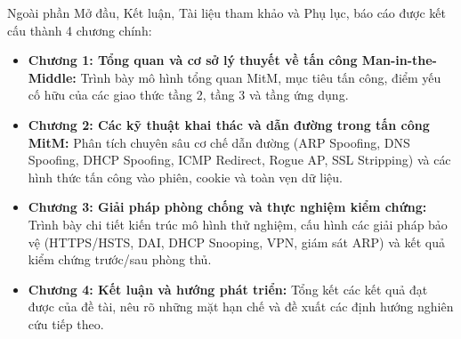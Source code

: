 Ngoài phần Mở đầu, Kết luận, Tài liệu tham khảo và Phụ lục, báo cáo được kết cấu thành 4 chương chính:
\begin{itemize}
  \item \textbf{Chương 1: Tổng quan và cơ sở lý thuyết về tấn công Man-in-the-Middle:} Trình bày mô hình tổng quan MitM, mục tiêu tấn công, điểm yếu cố hữu của các giao thức tầng 2, tầng 3 và tầng ứng dụng.
  \item \textbf{Chương 2: Các kỹ thuật khai thác và dẫn đường trong tấn công MitM:} Phân tích chuyên sâu cơ chế dẫn đường (ARP Spoofing, DNS Spoofing, DHCP Spoofing, ICMP Redirect, Rogue AP, SSL Stripping) và các hình thức tấn công vào phiên, cookie và toàn vẹn dữ liệu.
  \item \textbf{Chương 3: Giải pháp phòng chống và thực nghiệm kiểm chứng:} Trình bày chi tiết kiến trúc mô hình thử nghiệm, cấu hình các giải pháp bảo vệ (HTTPS/HSTS, DAI, DHCP Snooping, VPN, giám sát ARP) và kết quả kiểm chứng trước/sau phòng thủ.
  \item \textbf{Chương 4: Kết luận và hướng phát triển:} Tổng kết các kết quả đạt được của đề tài, nêu rõ những mặt hạn chế và đề xuất các định hướng nghiên cứu tiếp theo.
\end{itemize}
